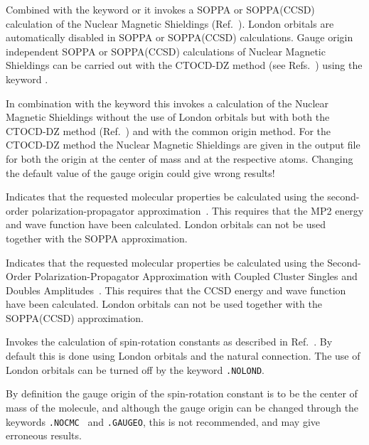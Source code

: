 \begin{description}
Combined with the keyword  or  it invokes a SOPPA 
or SOPPA(CCSD) calculation of the Nuclear Magnetic Shieldings 
(Ref.~\cite{paololazz1,paololazz2,ctocd}). London orbitals are automatically disabled in 
SOPPA or SOPPA(CCSD) 
calculations. Gauge origin independent SOPPA or SOPPA(CCSD) calculations of Nuclear 
Magnetic Shieldings can be carried out with the CTOCD-DZ method 
(see Refs.~\cite{paololazz1,paololazz2,ctocd}) using the keyword .

In combination with the keyword  this invokes a calculation of the
Nuclear Magnetic Shieldings without the use of London orbitals but with both 
the CTOCD-DZ method (Ref.~\cite{paololazz1,paololazz2,ctocd}) and with the common 
origin method. For the CTOCD-DZ method the Nuclear Magnetic Shieldings are given in
the output file for both the origin at the center of mass and at the respective atoms.
Changing the default value of the gauge origin could give wrong results!

\item[\Key{SOPPA}] Indicates that the requested molecular properties
be calculated using the second-order polarization-propagator
approximation~\cite{mjpekdtehjajjojcp}. This requires that the MP2 energy and wave
function have been calculated. London orbitals can not be used
together with the SOPPA approximation.

\item[\Key{SOPPA(CCSD)}] Indicates that the requested molecular properties
be calculated using the Second-Order Polarization-Propagator Approximation with Coupled
Cluster Singles and Doubles Amplitudes~\cite{soppaccsd,tejospastcan100,ekdspasjpca102,ctocd}. 
This requires that the CCSD energy and wave function have been calculated. 
London orbitals can not be used together with the SOPPA(CCSD) approximation.

\item[\Key{SPIN-R}] Invokes the calculation of
spin-rotation
constants as described in Ref.~\cite{jgkrthjcp105}. By default this is
done using London orbitals  and the 
natural connection. The use of London
orbitals can be turned off by the keyword \verb|.NOLOND|.

By definition the gauge origin of the
spin-rotation constant is to be the 
center of mass of the molecule, and although the
gauge origin can be 
changed through the keywords \verb|.NOCMC | and \verb|.GAUGEO|, this
is not recommended, and may give erroneous results.


\end{description}

